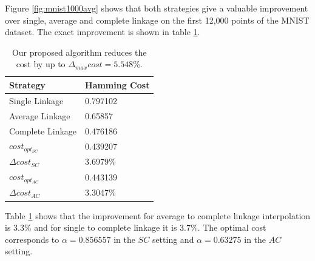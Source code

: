 Figure \ref{fig:mnist1000avg} shows that both strategies give a valuable improvement over single, average and complete linkage on the first 12,000 points of the MNIST dataset. The exact improvement is shown in table \ref{table:mnist1000avg}.

\begin{table}[h]
    \centering
    \begin{tabular}{|l | l |}
    \hline
    Strategy & Hamming Cost\\ \hline
    Single Linkage & 0.797102\\
    Average Linkage & 0.65857\\
    Complete Linkage & 0.476186\\
    $cost_{opt_{SC}}$ & 0.439207\\
    $\Delta cost_{SC}$ & 3.6979\%\\
    $cost_{opt_{AC}}$ & 0.443139\\
    $\Delta cost_{AC}$ & 3.3047\%\\\hline
    \end{tabular}
    \caption{Our proposed algorithm reduces the cost by up to $\Delta_{max} cost = 5.548\%$.}
    \label{table:mnist1000avg}
\end{table}

Table \ref{table:mnist1000avg} shows that the improvement for average to complete linkage interpolation is $3.3\%$ and for single to complete linkage it is $3.7\%$. The optimal cost corresponds to $\alpha = 0.856557$ in the $SC$ setting and $\alpha = 0.63275$ in the $AC$ setting.

